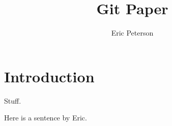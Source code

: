 \documentclass[12pt]{article}
\author{Eric Peterson} \title{Git Paper}
\begin{document}
\maketitle
\section{Introduction}

Stuff.

Here is a sentence by Eric.
\end{document}
